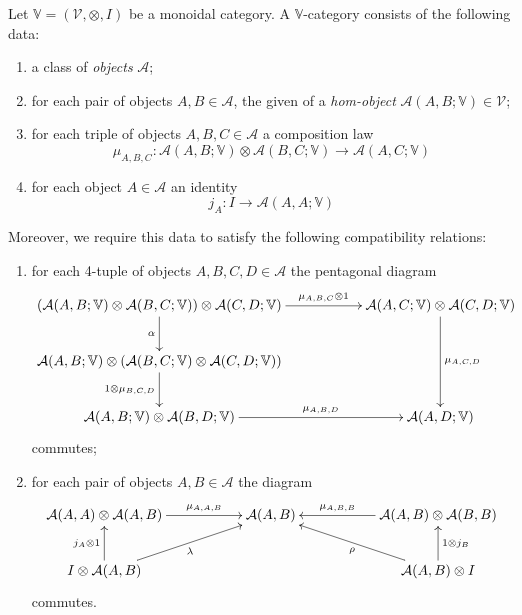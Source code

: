 \begin{refsection}
\begin{defin} \label{def enriched category}
Let $\mathbb V = (\mathcal V, \otimes, I)$ be a monoidal category. A $\mathbb V$-category consists of the following data:
\begin{enumerate}
\item a class of \emph{objects} $\mathcal A$;
\item for each pair of objects $A,B \in \mathcal A$, the given of a \emph{hom-object} $\mathcal A(A,B;\mathbb V) \in \mathcal V$;
\item for each triple of objects $A,B,C \in \mathcal A$ a composition law
\[
\mu_{A,B,C} \colon \mathcal A(A,B; \mathbb V) \otimes \mathcal A(B,C; \mathbb V) \to \mathcal A(A,C;\mathbb V)
\]
\item for each object $A \in \mathcal A$ an identity
\[
j_A \colon I \to \mathcal A(A,A;\mathbb V)
\]
\end{enumerate}
Moreover, we require this data to satisfy the following compatibility relations: 
\begin{enumerate}
\item for each 4-tuple of objects $A,B,C,D \in \mathcal A$ the pentagonal diagram
\[
\xymatrix{
(\mathcal A(A,B; \mathbb V) \otimes \mathcal A(B,C; \mathbb V)) \otimes \mathcal A(C,D;\mathbb V) \ar[d]_\alpha \ar[rr]^-{\mu_{A,B,C} \otimes 1} & & \mathcal A(A,C;\mathbb V) \otimes \mathcal A(C,D;\mathbb V) \ar[dd]^{\mu_{A,C,D}} \\
\mathcal A(A,B; \mathbb V) \otimes (\mathcal A(B,C; \mathbb V) \otimes \mathcal A(C,D;\mathbb V)) \ar[d]_{1 \otimes \mu_{B,C,D}} \\ \mathcal A(A,B;\mathbb V) \otimes \mathcal A(B,D;\mathbb V) \ar[rr]^-{\mu_{A,B,D}} & & \mathcal A(A,D;\mathbb V)
}
\]
commutes;
\item for each pair of objects $A,B \in \mathcal A$ the diagram
\[
\xymatrix{
\mathcal A(A,A) \otimes \mathcal A(A,B) \ar[rr]^-{\mu_{A,A,B}} & & \mathcal A(A,B) & & \mathcal A(A,B) \otimes \mathcal A(B,B) \ar[ll]_-{\mu_{A,B,B}} \\ I \otimes \mathcal A(A,B) \ar[u]^{j_A \otimes 1} \ar[urr]_{\lambda} & & & & \mathcal A(A,B) \otimes I \ar[u]_{1 \otimes j_B} \ar[ull]^{\rho}
}
\]
commutes.
\end{enumerate}
\end{defin}



\end{refsection}
